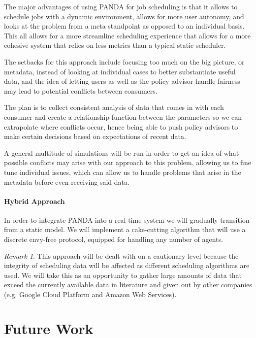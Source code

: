\documentclass{article}
\theoremstyle{definition}
\theoremstyle{remark}
\newtheorem*{remark}{Remark}
\begin{document}
		The major advantages of using PANDA for job scheduling is that it allows to schedule jobs with a dynamic environment, allows for more user autonomy, and looks at the problem from a meta standpoint as opposed to an individual basis.  This all allows for a more streamline scheduling experience that allows for a more cohesive system that relies on less metrics than a typical static scheduler.
		
		The setbacks for this approach include focusing too much on the big picture, or metadata, instead of looking at individual cases to better substantiate useful data, and the idea of letting users as well as the policy advisor handle fairness may lead to potential conflicts between consumers.
		
		The plan is to collect consistent analysis of data that comes in with each consumer and create a relationship function between the parameters so we can extrapolate where conflicts occur, hence being able to push policy advisors to make certain decisions based on expectations of recent data.
		
		A general multitude of simulations will be run in order to get an idea of what possible conflicts may arise with our approach to this problem, allowing us to fine tune individual issues, which can allow us to handle problems that arise in the metadata before even receiving said data.

		\paragraph{Hybrid Approach} 
		
		In order to integrate PANDA into a real-time system we will gradually transition from a static model. We will implement a cake-cutting algorithm that will use a discrete envy-free protocol, equipped for handling any number of agents. 
		
		\begin{remark}
			This approach will be dealt with on a cautionary level because the integrity of scheduling data will be affected as different scheduling algorithms are used. We will take this as an opportunity to gather large amounts of data that exceed the currently available data in literature and given out by other companies (e.g. Google Cloud Platform and Amazon Web Services).
		\end{remark}
	
	\section{Future Work}
	
\end{document}
